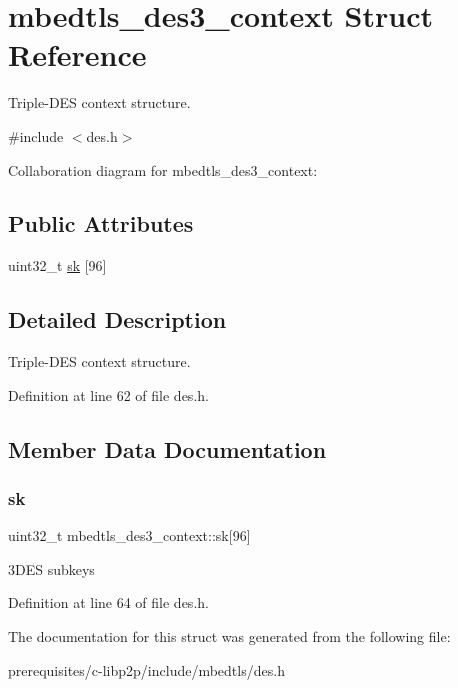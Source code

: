 \hypertarget{structmbedtls__des3__context}{}\section{mbedtls\+\_\+des3\+\_\+context Struct Reference}
\label{structmbedtls__des3__context}


Triple-\/\+D\+ES context structure.  




{\ttfamily \#include $<$des.\+h$>$}



Collaboration diagram for mbedtls\+\_\+des3\+\_\+context\+:
\subsection*{Public Attributes}
\begin{DoxyCompactItemize}
\item 
uint32\+\_\+t \mbox{\hyperlink{structmbedtls__des3__context_a59ed9ecb227b3d24bddd3993309fb6b4}{sk}} \mbox{[}96\mbox{]}
\end{DoxyCompactItemize}


\subsection{Detailed Description}
Triple-\/\+D\+ES context structure. 

Definition at line 62 of file des.\+h.



\subsection{Member Data Documentation}
\mbox{\label{structmbedtls__des3__context_a59ed9ecb227b3d24bddd3993309fb6b4}} 
\subsubsection{\texorpdfstring{sk}{sk}}
{\footnotesize\ttfamily uint32\+\_\+t mbedtls\+\_\+des3\+\_\+context\+::sk\mbox{[}96\mbox{]}}

3\+D\+ES subkeys 

Definition at line 64 of file des.\+h.



The documentation for this struct was generated from the following file\+:\begin{DoxyCompactItemize}
\item 
prerequisites/c-\/libp2p/include/mbedtls/des.\+h\end{DoxyCompactItemize}
